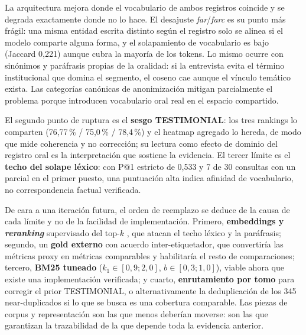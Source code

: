 \documentclass[11pt]{tg_usta}
\begin{document}
La arquitectura mejora donde el vocabulario de ambos registros coincide y se degrada exactamente donde no lo hace. El desajuste \textit{far}/\textit{farc} es su punto más frágil: una misma entidad escrita distinto según el registro solo se alinea si el modelo comparte alguna forma, y el solapamiento de vocabulario es bajo (Jaccard 0,221) aunque cubra la mayoría de los tokens. Lo mismo ocurre con sinónimos y paráfrasis propias de la oralidad: si la entrevista evita el término institucional que domina el segmento, el coseno cae aunque el vínculo temático exista. Las categorías canónicas de anonimización mitigan parcialmente el problema porque introducen vocabulario oral real en el espacio compartido.

El segundo punto de ruptura es el \textbf{sesgo TESTIMONIAL}: los tres rankings lo comparten (76,77\,\% / 75,0\,\% / 78,4\,\%) y el heatmap agregado lo hereda, de modo que mide coherencia y no corrección; su lectura como efecto de dominio del registro oral \cite{castillejo2023escuchar} es la interpretación que sostiene la evidencia. El tercer límite es el \textbf{techo del solape léxico}: con P@1 estricto de 0,533 y 7 de 30 consultas con un parcial en el primer puesto, una puntuación alta indica afinidad de vocabulario, no correspondencia factual verificada.

De cara a una iteración futura, el orden de reemplazo se deduce de la causa de cada límite y no de la facilidad de implementación. Primero, \textbf{embeddings y \emph{reranking}} supervisado del top-$k$ \cite{valentini2024messirve}, que atacan el techo léxico y la paráfrasis; segundo, un \textbf{gold externo} con acuerdo inter-etiquetador, que convertiría las métricas proxy en métricas comparables y habilitaría el resto de comparaciones; tercero, \textbf{BM25 tuneado} ($k_1\in[0{,}9;2{,}0]$, $b\in[0{,}3;1{,}0]$), viable ahora que existe una implementación verificada; y cuarto, \textbf{enrutamiento por tomo} para corregir el prior TESTIMONIAL, o alternativamente la deduplicación de los 345 near-duplicados si lo que se busca es una cobertura comparable. Las piezas de corpus y representación son las que menos deberían moverse: son las que garantizan la trazabilidad de la que depende toda la evidencia anterior.

\nocite{*}

{\footnotesize\sloppy
\setlength{\itemsep}{1pt plus 0.2ex}
\setlength{\parsep}{0pt}
}
\end{document}
